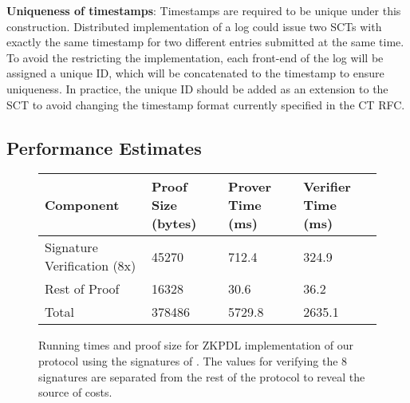 \documentclass[letterpaper,twocolumn,10pt]{article}
\begin{document}
\textbf{Uniqueness of timestamps}: Timestamps are required to be unique under this construction. Distributed implementation of a log could issue two SCTs with exactly the same timestamp for two different entries submitted at the same time. To avoid the restricting the implementation, each front-end of the log will be assigned a unique ID, which will be concatenated to the timestamp to ensure uniqueness. In practice, the unique ID should be added as an extension to the SCT to avoid changing the timestamp format currently specified in the CT RFC.

\subsection{Performance Estimates}
\begin{center}
\begin{figure*}
    \begin{tabular}{ | l | l | l | l |}
    \hline
    Component & Proof Size (bytes) & Prover Time (ms) & Verifier Time (ms) \\ \hline
    Signature Verification (8x) & 45270 & 712.4 & 324.9 \\ \hline
    Rest of Proof & 16328 & 30.6 & 36.2 \\ \hline
    Total & 378486 & 5729.8 & 2635.1 \\
    \hline
    \end{tabular}
    \caption{Running times and proof size for ZKPDL implementation of our protocol using the signatures of \cite{CL02}. The values for verifying the 8 signatures are separated from the rest of the protocol to reveal the source of costs.}
\label{ZKP_perf}
\end{figure*}
\end{center}
\end{document}
